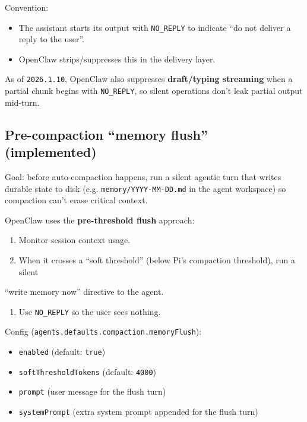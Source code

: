 Convention:

\begin{itemize}
  \item The assistant starts its output with \texttt{NO\_REPLY} to indicate “do not deliver a reply to the user”.
  \item OpenClaw strips/suppresses this in the delivery layer.
\end{itemize}


As of \texttt{2026.1.10}, OpenClaw also suppresses \textbf{draft/typing streaming} when a partial chunk begins with \texttt{NO\_REPLY}, so silent operations don’t leak partial output mid-turn.

\hrulefill


\subsection{Pre-compaction “memory flush” (implemented)}


Goal: before auto-compaction happens, run a silent agentic turn that writes durable
state to disk (e.g. \texttt{memory/YYYY-MM-DD.md} in the agent workspace) so compaction can’t
erase critical context.

OpenClaw uses the \textbf{pre-threshold flush} approach:

\begin{enumerate}
  \item Monitor session context usage.
  \item When it crosses a “soft threshold” (below Pi’s compaction threshold), run a silent
\end{enumerate}

“write memory now” directive to the agent.
\begin{enumerate}
  \item Use \texttt{NO\_REPLY} so the user sees nothing.
\end{enumerate}


Config (\texttt{agents.defaults.compaction.memoryFlush}):

\begin{itemize}
  \item \texttt{enabled} (default: \texttt{true})
  \item \texttt{softThresholdTokens} (default: \texttt{4000})
  \item \texttt{prompt} (user message for the flush turn)
  \item \texttt{systemPrompt} (extra system prompt appended for the flush turn)
\end{itemize}


